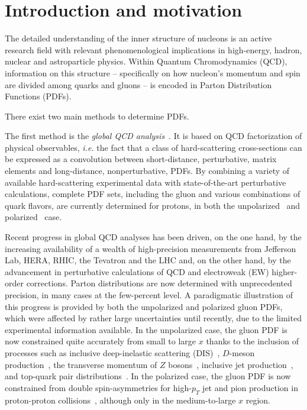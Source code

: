 \section{Introduction and motivation}

The detailed understanding of the inner structure of nucleons is an 
active research field with relevant phenomenological implications in 
high-energy, hadron, nuclear and astroparticle physics.
%
Within Quantum Chromodynamics (QCD), information on this structure --
specifically on how nucleon's momentum and spin are divided among quarks and 
gluons -- is encoded in Parton Distribution Functions (PDFs).

There exist two main methods to determine PDFs.

The first method is the {\it global QCD analysis}~\cite{Perez:2012um,
DeRoeck:2011na,Alekhin:2011sk,Ball:2012wy,Forte:2013wc,Jimenez-Delgado:2013sma,
Rojo:2015acz,Butterworth:2015oua,Accardi:2016ndt,Gao:2017yyd}.
%
It is based on QCD factorization of physical observables, {\it i.e.}
the fact that a class of hard-scattering cross-sections can be expressed as a 
convolution between short-distance, perturbative, matrix 
elements and long-distance, nonperturbative, PDFs.
%
By combining a variety of available hard-scattering experimental data with 
state-of-the-art perturbative calculations, complete PDF sets, including 
the gluon and various combinations of quark flavors, are currently determined
for protons, in both the unpolarized~\cite{Ball:2017nwa,Harland-Lang:2014zoa,
Dulat:2015mca,Alekhin:2017kpj,Accardi:2016qay} and 
polarized~\cite{Nocera:2014gqa,deFlorian:2009vb,Sato:2016tuz,Hirai:2008aj} case.

Recent progress in global QCD analyses has been driven, on the one hand, 
by the increasing availability of a wealth of high-precision measurements from 
Jefferson Lab, HERA, RHIC, the Tevatron and the LHC and, on the other hand, 
by the advancement in perturbative calculations of QCD and 
electroweak (EW) higher-order corrections.
%
Parton distributions are now determined with unprecedented precision, 
in many cases at the few-percent level.
%
A paradigmatic illustration of this progress is provided by both the 
unpolarized and polarized gluon PDFs, which were affected by rather large 
uncertainties until recently, due to the limited experimental information 
available.
%
In the unpolarized case, the gluon PDF is now constrained quite accurately from 
small to large $x$ thanks to the inclusion of processes such as 
inclusive deep-inelastic scattering (DIS)~\cite{Abramowicz:2015mha}, 
$D$-meson production~\cite{Zenaiev:2015rfa,Gauld:2016kpd},
the transverse momentum of $Z$ bosons~\cite{Boughezal:2017nla},
inclusive jet production~\cite{Currie:2016bfm}, and top-quark pair
distributions~\cite{Czakon:2016olj,Guzzi:2014wia}.
%
In the polarized case, the gluon PDF is now constrained from double 
spin-asymmetries for high-$p_T$ jet and pion production in proton-proton 
collisions~\cite{deFlorian:2014yva,Nocera:2014gqa}, 
although only in the medium-to-large $x$ region.

